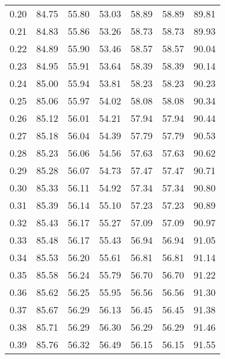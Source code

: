 \begin{tabular}{|c|c|c|c|c|c|c|}
      0.20 &     84.75 &     55.80 &      53.03 &   58.89 &      58.89 &         89.81 \\
      0.21 &     84.83 &     55.86 &      53.26 &   58.73 &      58.73 &         89.93 \\
      0.22 &     84.89 &     55.90 &      53.46 &   58.57 &      58.57 &         90.04 \\
      0.23 &     84.95 &     55.91 &      53.64 &   58.39 &      58.39 &         90.14 \\
      0.24 &     85.00 &     55.94 &      53.81 &   58.23 &      58.23 &         90.23 \\
      0.25 &     85.06 &     55.97 &      54.02 &   58.08 &      58.08 &         90.34 \\
      0.26 &     85.12 &     56.01 &      54.21 &   57.94 &      57.94 &         90.44 \\
      0.27 &     85.18 &     56.04 &      54.39 &   57.79 &      57.79 &         90.53 \\
      0.28 &     85.23 &     56.06 &      54.56 &   57.63 &      57.63 &         90.62 \\
      0.29 &     85.28 &     56.07 &      54.73 &   57.47 &      57.47 &         90.71 \\
      0.30 &     85.33 &     56.11 &      54.92 &   57.34 &      57.34 &         90.80 \\
      0.31 &     85.39 &     56.14 &      55.10 &   57.23 &      57.23 &         90.89 \\
      0.32 &     85.43 &     56.17 &      55.27 &   57.09 &      57.09 &         90.97 \\
      0.33 &     85.48 &     56.17 &      55.43 &   56.94 &      56.94 &         91.05 \\
      0.34 &     85.53 &     56.20 &      55.61 &   56.81 &      56.81 &         91.14 \\
      0.35 &     85.58 &     56.24 &      55.79 &   56.70 &      56.70 &         91.22 \\
      0.36 &     85.62 &     56.25 &      55.95 &   56.56 &      56.56 &         91.30 \\
      0.37 &     85.67 &     56.29 &      56.13 &   56.45 &      56.45 &         91.38 \\
      0.38 &     85.71 &     56.29 &      56.30 &   56.29 &      56.29 &         91.46 \\
      0.39 &     85.76 &     56.32 &      56.49 &   56.15 &      56.15 &         91.55 \\

\end{tabular}
